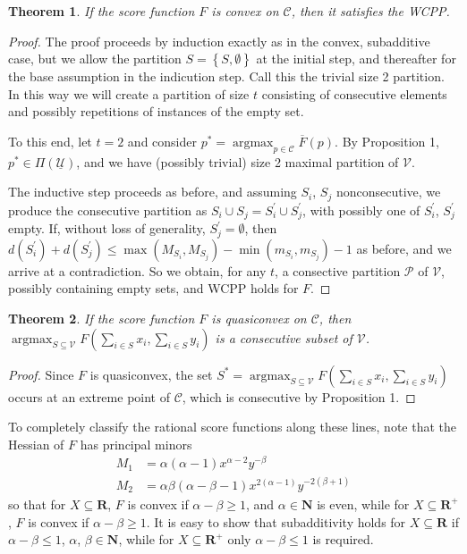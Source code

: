 \documentclass{article}
\newtheorem{thm}{Theorem}
\theoremstyle{case}
\DeclareMathOperator*{\argmax}{argmax} %
\begin{document}
\begin{thm} \label{thm2}
If the score function $F$ is convex on $\mathcal{C}$, then it satisfies the WCPP.
\end{thm}
\begin{proof}
The proof proceeds by induction exactly as in the convex, subadditive case, but we allow the partition $S = \left\lbrace S, \emptyset \right\rbrace$ at the initial step, and thereafter for the base assumption in the indicution step. Call this the trivial size 2 partition. In this way we will create a partition of size $t$ consisting of consecutive elements and possibly repetitions of instances of the empty set. 

To this end, let $t = 2$ and consider $p^* = \argmax_{p \in \mathcal{C}} \overline{F}(p)$. By Proposition 1, $p^* \in \Pi(\underline{\mathcal{U}})$, and we have (possibly trivial) size 2 maximal partition of $\mathcal{V}$. 

The inductive step proceeds as before, and assuming $S_i$, $S_j$ nonconsecutive, we produce the consecutive partition as $S_i \cup S_j = S^{\prime}_i \cup S^{\prime}_j$, with possibly one of $S_i^{\prime}$, $S_j^{\prime}$ empty. If, without loss of generality, $S_j^{\prime} = \emptyset$, then $d\left( S^{\prime}_i\right) + d\left( S^{\prime}_j\right) \leq \max\left( M_{S_i}, M_{S_j}\right) - \min\left( m_{S_i}, m_{S_j}\right) - 1$ as before, and we arrive at a contradiction. So we obtain, for any $t$, a consective partition $\mathcal{P}$ of $\mathcal{V}$, possibly containing empty sets, and WCPP holds for $F$.
\end{proof}

\begin{thm}
If the score function $F$ is quasiconvex on $\mathcal{C}$, then $\argmax_{S \subseteq \mathcal{V}}F(\sum_{i \in S}x_i, \sum_{i \in S}y_i)$ is a consecutive subset of $\mathcal{V}$.
\end{thm}
\begin{proof}
Since $F$ is quasiconvex, the set $S^* = \argmax_{S \subseteq \mathcal{V}}F(\sum_{i \in S}x_i, \sum_{i \in S}y_i)$ occurs at an extreme point of $\mathcal{C}$, which is consecutive by Proposition 1.
\end{proof}

To completely classify the rational score functions along these lines, note that the Hessian of $F$ has principal minors
\begin{align*}
M_1 &= \alpha(\alpha-1)x^{\alpha-2}y^{-\beta} \\
M_2 &= \alpha\beta(\alpha-\beta-1)x^{2(\alpha-1)}y^{-2(\beta+1)}
\end{align*}
so that for $X \subseteq \mathbf{R}$, $F$ is convex if $\alpha - \beta \geq 1$, and $\alpha \in \mathbf{N}$ is even, while for $X \subseteq \mathbf{R}^+$, $F$ is convex if $\alpha - \beta \geq 1$. It is easy to show that subadditivity holds for $X \subseteq \mathbf{R}$ if $\alpha - \beta \leq 1$, $\alpha$, $\beta \in \mathbf{N}$, while for $X \subseteq \mathbf{R}^+$ only $\alpha - \beta \leq 1$ is required.
\end{document}
